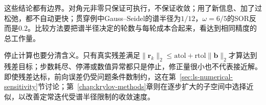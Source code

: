 这些结论都有边界。对角元非零只保证可执行，不保证收敛；用了新信息、加了过松弛，都不自动更快；贯穿例中Gauss--Seidel的谱半径为$1/12$，$\omega=6/5$的SOR反而是$0.2$。比较方法要把谱半径决定的轮数与每轮成本合起来，看达到相同精度的总工作量。

停止计算也要分清含义。只有真实残差满足$\lVert\bm r_k\rVert_2\leq\mathrm{atol}+\mathrm{rtol}\lVert\bm b\rVert_2$才算达到残差目标；步数耗尽、停滞或数值异常都只是停止，修正量很小也不代表接近解。即使残差达标，前向误差仍受问题条件数制约，这在第~\ref{sec:ls-numerical-sensitivity}节讨论；第~\ref{chap:krylov-methods}章则在逐步扩大的子空间中选择近似，以改善定常迭代受谱半径限制的收敛速度。
